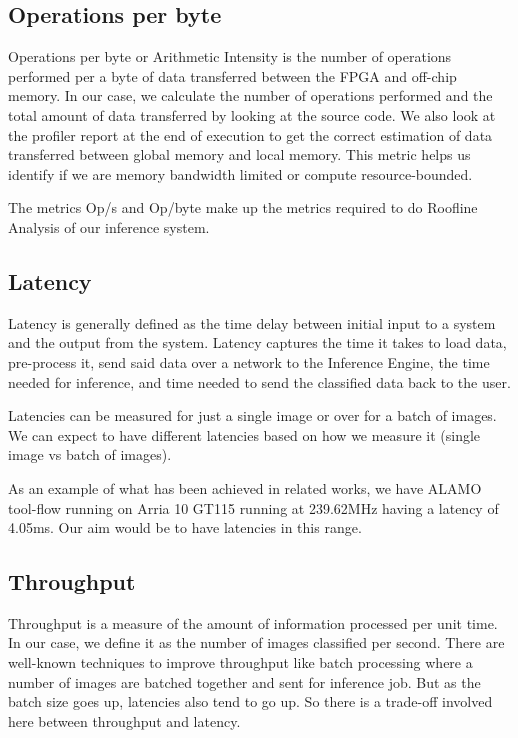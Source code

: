 \documentclass[titlepage]{report}
\begin{document}
\subsection{Operations per byte}
Operations per byte or Arithmetic Intensity is the number of operations performed per a byte of data transferred between the FPGA and off-chip memory.  
In our case, we calculate the number of operations performed and the total amount of data transferred by looking at the source code. We also look at the profiler report at the end of execution to get the correct estimation of data transferred between global memory and local memory.  
This metric helps us identify if we are memory bandwidth limited or compute resource-bounded.  

The metrics Op/s and Op/byte make up the metrics required to do Roofline Analysis of our inference system.  


\subsection{Latency}
Latency is generally defined as the time delay between initial input to a system and the output from the system. Latency captures the time it takes to load data, pre-process it, send said data over a network to the Inference Engine, the time needed for inference, and time needed to send the classified data back to the user.   

Latencies can be measured for just a single image or over for a batch of images. We can expect to have different latencies based on how we measure it (single image vs batch of images).  

As an example of what has been achieved in related works, we have ALAMO tool-flow running on Arria 10 GT115 running at 239.62MHz having a latency of 4.05ms.
Our aim would be to have latencies in this range.

\subsection{Throughput}
Throughput is a measure of the amount of information processed per unit time. In our case, we define it as the number of images classified per second.  There are well-known techniques to improve throughput like batch processing where a number of images are batched together and sent for inference job. 
But as the batch size goes up, latencies also tend to go up. So there is a trade-off involved here between throughput and latency.
\end{document}

